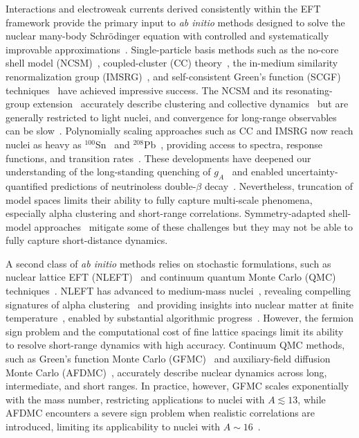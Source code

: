 Interactions and electroweak currents derived consistently within the EFT framework provide the primary input to \emph{ab initio} methods designed to solve the nuclear many-body Schr\"odinger equation with controlled and systematically improvable approximations~\cite{hergert_guided_2020,ekstrom_what_2023}. Single-particle basis methods such as the no-core shell model (NCSM)~\cite{barrett_ab_2013}, coupled-cluster (CC) theory~\cite{hagen_coupled-cluster_2014}, the in-medium similarity renormalization group (IMSRG)~\cite{hergert_-medium_2016}, and self-consistent Green's function (SCGF) techniques~\cite{Carbone:2013eqa} have achieved impressive success. The NCSM and its resonating-group extension~\cite{navratil_recent_2009} accurately describe clustering and collective dynamics~\cite{quaglioni_ab_2008,roth_similarity-transformed_2011,mccoy_emergent_2020} but are generally restricted to light nuclei, and convergence for long-range observables can be slow~\cite{caprio_robust_2022}. Polynomially scaling approaches such as CC and IMSRG now reach nuclei as heavy as $^{100}$Sn~\cite{hagen_structure_2016,morris_structure_2018,mougeot_mass_2021} and $^{208}$Pb~\cite{hu_ab_2022}, providing access to spectra, response functions, and transition rates~\cite{sobczyk_ab_2021,acharya_16o_2024,bonaiti_electromagnetic_2024}. These developments have deepened our understanding of the long-standing quenching of $g_A$~\cite{gysbers_discrepancy_2019} and enabled uncertainty-quantified predictions of neutrinoless double-$\beta$ decay~\cite{yao_ab_2020,wirth_ab_2021,belley_ab_2021}. Nevertheless, truncation of model spaces limits their ability to fully capture multi-scale phenomena, especially alpha clustering and short-range correlations. Symmetry-adapted shell-model approaches~\cite{launey_symmetry-guided_2016,dytrych_physics_2020} mitigate some of these challenges but they may not  be able to fully capture short-distance dynamics.

A second class of \emph{ab initio} methods relies on stochastic formulations, such as nuclear lattice EFT (NLEFT)~\cite{lee_lattice_2025} and continuum quantum Monte Carlo (QMC) techniques~\cite{carlson_quantum_2015,lynn2019,gandolfi2020}. NLEFT has advanced to medium-mass nuclei~\cite{elhatisari_wavefunction_2024}, revealing compelling signatures of alpha clustering~\cite{shen_emergent_2023} and providing insights into nuclear matter at finite temperature~\cite{Ren:2023ued,ma_structure_2024}, enabled by substantial algorithmic progress~\cite{sarkar_floating_2023}. However, the fermion sign problem and the computational cost of fine lattice spacings limit its ability to resolve short-range dynamics with high accuracy. Continuum QMC methods, such as Green’s function Monte Carlo (GFMC)~\cite{carlson_alpha_1988} and auxiliary-field diffusion Monte Carlo (AFDMC)~\cite{Schmidt:1999lik}, accurately describe nuclear dynamics across long, intermediate, and short ranges. In practice, however, GFMC scales exponentially with the mass number, restricting applications to nuclei with $A \lesssim 13$, while AFDMC encounters a severe sign problem when realistic correlations are introduced, limiting its applicability to nuclei with $A \sim 16$~\cite{novario_trends_2023,martin_auxiliary_2023}.



